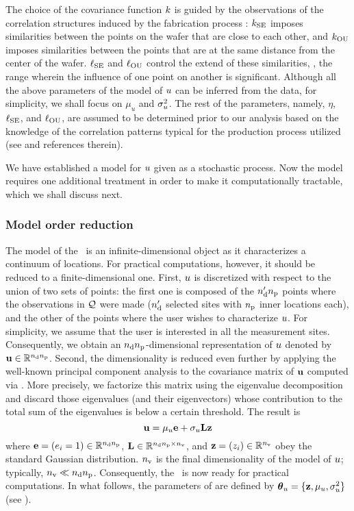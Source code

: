 The choice of the covariance function $\fCov$ is guided by the observations of the correlation structures induced by the fabrication process \cite{chandrakasan2001, cheng2011}: $\fCov_\SE$ imposes similarities between the points on the wafer that are close to each other, and $\fCov_\OU$ imposes similarities between the points that are at the same distance from the center of the wafer.
$\ell_{\text{SE}}$ and $\ell_{\text{OU}}$ control the extend of these similarities, \ie, the range wherein the influence of one point on another is significant.
Although all the above parameters of the model of $u$ can be inferred from the data, for simplicity, we shall focus on $\mu_u$ and $\sigma_u^2$.
The rest of the parameters, namely, $\eta$, $\ell_{\text{SE}}$, and $\ell_{\text{OU}}$, are assumed to be determined prior to our analysis based on the knowledge of the correlation patterns typical for the production process utilized (see \cite{marzouk2009} and references therein).

We have established a model for $u$ given as a stochastic process.
Now the model requires one additional treatment in order to make it computationally tractable, which we shall discuss next.


\subsubsection{Model order reduction} 
The model of the \qoi\ is an infinite-dimensional object as it characterizes a continuum of locations.
For practical computations, however, it should be reduced to a finite-dimensional one.
First, $u$ is discretized with respect to the union of two sets of points: the first one is composed of the ${n_\text{d}'} {n_\text{p}}$ points where the observations in $\mathcal{Q}$ were made (${n_\text{d}'}$ selected sites with ${n_\text{p}}$ inner locations each), and the other of the points where the user wishes to characterize $u$.
For simplicity, we assume that the user is interested in all the measurement sites.
Consequently, we obtain an ${n_\text{d}} {n_\text{p}}$-dimensional representation of $u$ denoted by $\mathbf{u} \in \mathbb{R}^{{n_\text{d}} {n_\text{p}}}$.
Second, the dimensionality is reduced even further by applying the well-known principal component analysis to the covariance matrix of $\mathbf{u}$ computed via .
More precisely, we factorize this matrix using the eigenvalue decomposition \cite{press2007} and discard those eigenvalues (and their eigenvectors) whose contribution to the total sum of the eigenvalues is below a certain threshold.
The result is
\begin{equation} \elabel{kl-approximation}
  \vu = \mu_\u \vOne + \sigma_\u \mKL \vz
\end{equation}
where $\mathbf{e} = (e_i = 1) \in \mathbb{R}^{{n_\text{d}} {n_\text{p}}}$, $\mathbf{L} \in \mathbb{R}^{{n_\text{d}} {n_\text{p}} \times {n_\text{v}}}$, and $\mathbf{z} = (z_i) \in \mathbb{R}^{n_\text{v}}$ obey the standard Gaussian distribution.
${n_\text{v}}$ is the final dimensionality of the model of $u$; typically, ${n_\text{v}} \ll {n_\text{d}} {n_\text{p}}$.
Consequently, the \qoi\ is now ready for practical computations.
In what follows, the parameters of  are defined by ${\boldsymbol\theta}_u = \{ \mathbf{z}, \mu_u, \sigma^2_u \}$ (see ).

